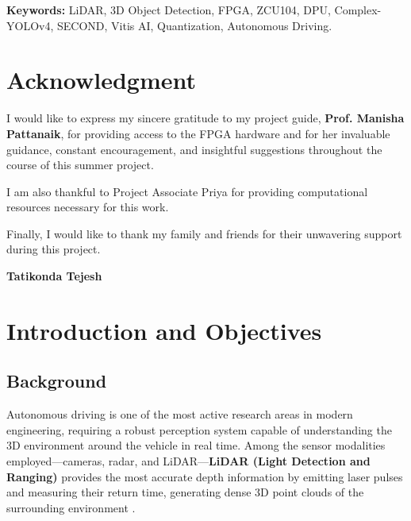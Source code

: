 \documentclass[12pt, a4paper]{report}
\begin{document}
\textbf{Keywords:} LiDAR, 3D Object Detection, FPGA, ZCU104, DPU, Complex-YOLOv4, SECOND, Vitis AI, Quantization, Autonomous Driving.


\chapter*{Acknowledgment}

I would like to express my sincere gratitude to my project guide, \textbf{Prof. Manisha Pattanaik}, for providing access to the FPGA hardware and for her invaluable guidance, constant encouragement, and insightful suggestions throughout the course of this summer project.

I am also thankful to {Project Associate Priya} for providing computational resources necessary for this work.

Finally, I would like to thank my family and friends for their unwavering support during this project.

\vspace{1cm}
\begin{flushright}
\textbf{{Tatikonda Tejesh}}
\end{flushright}


\tableofcontents
\listoffigures
\listoftables


\chapter{Introduction and Objectives}

\section{Background}

Autonomous driving is one of the most active research areas in modern engineering, requiring a robust perception system capable of understanding the 3D environment around the vehicle in real time. Among the sensor modalities employed---cameras, radar, and LiDAR---\textbf{LiDAR (Light Detection and Ranging)} provides the most accurate depth information by emitting laser pulses and measuring their return time, generating dense 3D point clouds of the surrounding environment \cite{kitti2012}.
\end{document}
